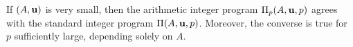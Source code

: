 \documentclass{amsart}
\begin{document}
\begin{lemma}
   \label{ip = aip: L}
   If $(A,\mathbf{u})$ is very small, then the arithmetic integer program $\Pi_p(A, \mathbf{u}, p)$ agrees with the standard integer program $\Pi(A, \mathbf{u}, p)$.
   Moreover, the converse is true for $p$ sufficiently large, depending solely on $A$.
\end{lemma}
\end{document}
